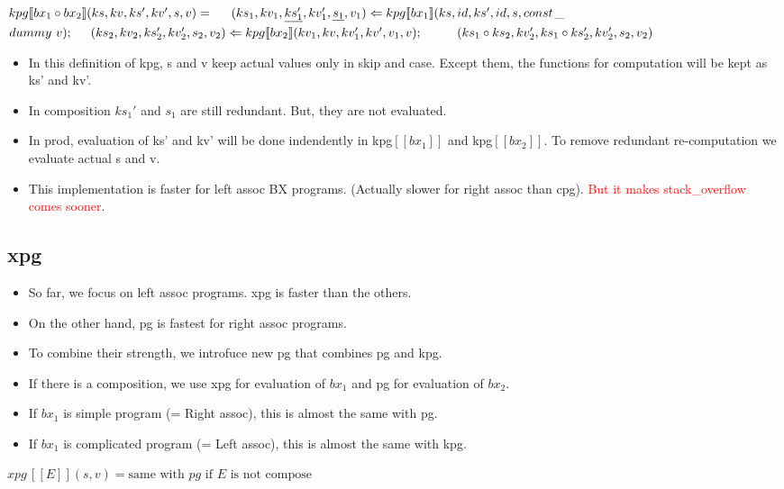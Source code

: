 \documentclass[runningheads]{llncs}
\newcommand{\tab}{\hspace*{5mm}}
\newcommand{\qtab}{\hspace*{5mm} \ \quad}
\newcommand{\kpg}[7]{kpg [\![#1]\!] (#2, #3, #4, #5, #6, #7)}
\newcommand{\xpg}[3]{xpg \, [\![#1]\!] (#2, #3)}
\begin{document}
$\kpg{bx_1 \circ bx_2}{ks}{kv}{ks'}{kv'}{s}{v} =\\
    \tab (ks_1, kv_1, \underline{ks_1'}, kv_1', \underline{s_1}, v_1) \Leftarrow \kpg{bx_1}{ks}{id}{ks'}{id}{s}{const$\_$dummy \ v};\\
    \tab (ks_2, kv_2, ks_2', kv_2', s_2, v_2) \Leftarrow \kpg{bx_2}{kv_1}{kv}{kv_1'}{kv'}{v_1}{v};\\
    \qtab (ks_1 \circ ks_2, kv_2', ks_1 \circ ks_2', kv_2', s_2, v_2)$\\


\begin{itemize}
    \item In this definition of kpg, s and v keep actual values only in skip and case. Except them, the functions for computation will be kept as ks' and kv'.
    \item In composition $ks_1'$ and $s_1$ are still redundant. But, they are not evaluated.
    \item In prod, evaluation of ks' and kv' will be done indendently in kpg$[\![bx_1]\!]$ and kpg$[\![bx_2]\!]$. To remove redundant re-computation we evaluate actual s and v.
    \item This implementation is faster for left assoc BX programs. (Actually slower for right assoc than cpg). \textcolor{red}{But it makes stack\_overflow comes sooner}.
\end{itemize}

\subsection{xpg}

\begin{itemize}
\item So far, we focus on left assoc programs. xpg is faster than the others.
\item On the other hand, pg is fastest for right assoc programs.
\item To combine their strength, we introfuce new pg that combines pg and kpg.
\item If there is a composition, we use xpg for evaluation of $bx_1$ and pg for evaluation of $bx_2$.
\item If $bx_1$ is simple program (= Right assoc), this is almost the same with pg.
\item If $bx_1$ is complicated program (= Left assoc), this is almost the same with kpg.
\end{itemize}

$\xpg{E}{s}{v} = \text{same with } pg \text{ if } E \text{ is not compose}$
\end{document}
